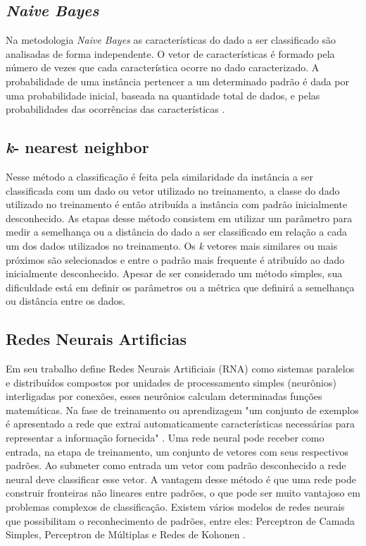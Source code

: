 \subsection{\it Naive Bayes}
Na metodologia \textit{Naive Bayes} as características do dado a ser classificado são analisadas de forma independente. O vetor de características é formado pela número de vezes que cada característica ocorre no dado caracterizado. A probabilidade de uma instância pertencer a um determinado padrão é dada por uma probabilidade inicial, baseada na quantidade total de dados, e pelas probabilidades das ocorrências das características \cite{McCallum98Bayes}\cite{Langley92Bayes}. %

\subsection{\textit{k}- nearest neighbor}
Nesse método a classificação é feita pela similaridade da instância a ser classificada com um dado ou vetor utilizado no treinamento, a classe do dado utilizado no treinamento é então atribuída a instância com padrão inicialmente desconhecido. As etapas desse método consistem em utilizar um parâmetro para medir a semelhança ou a distância do dado a ser classificado em relação a cada um dos dados utilizados no treinamento. Os \textit{k} vetores mais similares ou mais próximos são selecionados e entre o padrão mais frequente é atribuído ao dado inicialmente desconhecido. Apesar de ser considerado um método simples, sua dificuldade está em definir os parâmetros ou a métrica que definirá a semelhança ou distância entre os dados\cite{Chagas09KNN}.

\subsection{Redes Neurais Artificias}
Em seu trabalho   define Redes Neurais Artificiais (RNA) como sistemas paralelos e distribuídos compostos por unidades de processamento simples (neurônios) interligadas por conexões, esses neurônios calculam determinadas funções matemáticas. Na fase de treinamento ou aprendizagem "um conjunto de exemplos é apresentado a rede que extrai automaticamente características necessárias para representar a informação fornecida" \cite{Morais2010RNA}.
Uma rede neural pode receber como entrada, na etapa de treinamento, um conjunto de vetores com seus respectivos padrões. Ao submeter como entrada um vetor com padrão desconhecido a rede neural deve classificar esse vetor. A vantagem desse método é que uma rede pode construir fronteiras não lineares entre padrões, o que pode ser muito vantajoso em problemas complexos de classificação. Existem vários modelos de redes neurais que possibilitam o reconhecimento de padrões, entre eles: Perceptron de Camada Simples, Perceptron de Múltiplas e Redes de Kohonen \cite{ZubenRNA2}.

